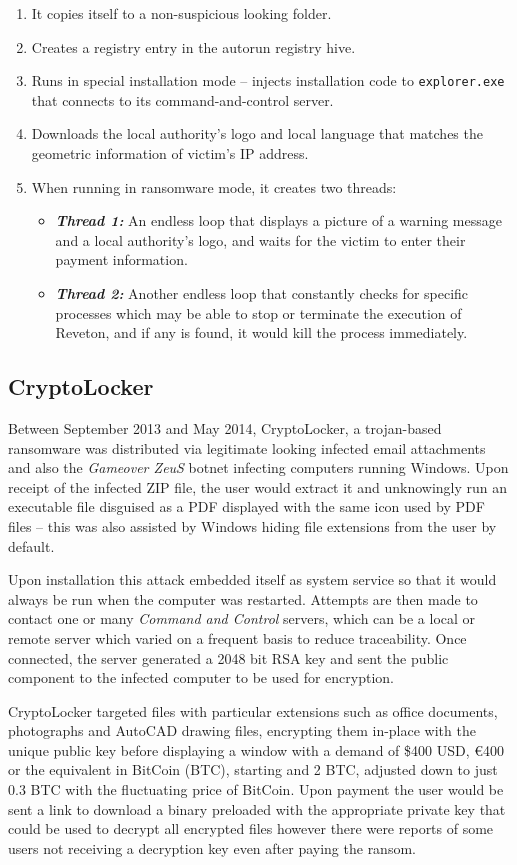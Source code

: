 \documentclass[10pt,a4paper]{article}
\begin{document}
\begin{enumerate}
\item It copies itself to a non-suspicious looking folder.
\item Creates a registry entry in the autorun registry hive.
\item Runs in special installation mode – injects installation code to \texttt{explorer.exe} that connects to its command-and-control server.
\item Downloads the local authority’s logo and local language that matches the geometric information of victim’s IP address.
\item When running in ransomware mode, it creates two threads:
\begin{itemize}
\item \textbf{\textit{Thread 1: }}An endless loop that displays a picture of a warning message and a local authority’s logo, and waits for the victim to enter their payment information.
\item \textbf{\textit{Thread 2: }}Another endless loop that constantly checks for specific processes which may be able to stop or terminate the execution of Reveton, and if any is found, it would kill the process immediately.
\end{itemize}
\end{enumerate}

\subsection{CryptoLocker}
Between September 2013 and May 2014, CryptoLocker, a trojan-based ransomware was distributed via legitimate looking infected email attachments and also the \textit{Gameover ZeuS} botnet infecting computers running Windows. Upon receipt of the infected ZIP file, the user would extract it and unknowingly run an executable file disguised as a PDF displayed with the same icon used by PDF files -- this was also assisted by Windows hiding file extensions from the user by default.

Upon installation this attack embedded itself as system service so that it would always be run when the computer was restarted. Attempts are then made to contact one or many \textit{Command and Control} servers, which can be a local or remote server which varied on a frequent basis to reduce traceability. Once connected, the server generated a 2048 bit RSA key and sent the public component to the infected computer to be used for encryption.

CryptoLocker targeted files with particular extensions such as office documents, photographs and AutoCAD drawing files, encrypting them in-place with the unique public key before displaying a window with a demand of \$400 USD, \euro400 or the equivalent in BitCoin (BTC), starting and 2 BTC, adjusted down to just 0.3 BTC with the fluctuating price of BitCoin. Upon payment the user would be sent a link to download a binary preloaded with the appropriate private key that could be used to decrypt all encrypted files however there were reports of some users not receiving a decryption key even after paying the ransom.
\end{document}
